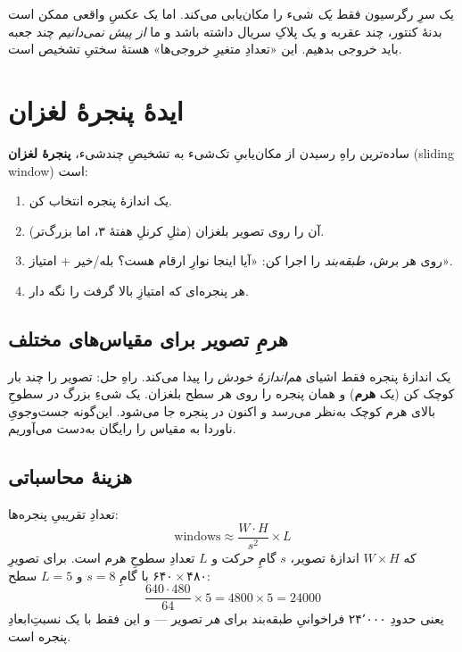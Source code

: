 \documentclass[12pt,a4paper]{article}
\begin{document}
\begin{hoshdar}
یک سرِ رگرسیون فقط \emph{یک} شیء را مکان‌یابی می‌کند. اما یک عکسِ واقعی ممکن است بدنهٔ کنتور، چند عقربه و یک پلاکِ سریال داشته باشد و ما \emph{از پیش نمی‌دانیم} چند جعبه باید خروجی بدهیم. این «تعدادِ متغیرِ خروجی‌ها» هستهٔ سختیِ تشخیص است.
\end{hoshdar}

\section{ایدهٔ پنجرهٔ لغزان}

ساده‌ترین راهِ رسیدن از مکان‌یابیِ تک‌شیء به تشخیصِ چندشیء، \textbf{پنجرهٔ لغزان} (sliding window) است:

\begin{enumerate}
  \item یک اندازهٔ پنجره انتخاب کن.
  \item آن را روی تصویر بلغزان (مثلِ کرنلِ هفتهٔ ۳، اما بزرگ‌تر).
  \item روی هر برش، \emph{طبقه‌بند} را اجرا کن: «آیا اینجا نوارِ ارقام هست؟ بله/خیر + امتیاز».
  \item هر پنجره‌ای که امتیازِ بالا گرفت را نگه دار.
\end{enumerate}

\subsection{هرمِ تصویر برای مقیاس‌های مختلف}

یک اندازهٔ پنجره فقط اشیای \emph{هم‌اندازهٔ خودش} را پیدا می‌کند. راهِ حل: تصویر را چند بار کوچک کن (یک \textbf{هرم}) و همان پنجره را روی هر سطح بلغزان. یک شیءِ بزرگ در سطوحِ بالای هرم کوچک به‌نظر می‌رسد و اکنون در پنجره جا می‌شود. این‌گونه جست‌وجویِ ناوردا به مقیاس را رایگان به‌دست می‌آوریم.

\subsection{هزینهٔ محاسباتی}

\begin{riyazi}
تعدادِ تقریبیِ پنجره‌ها:
\[
\text{windows}\approx \frac{W\cdot H}{s^2}\times L
\]
که $W\times H$ اندازهٔ تصویر، $s$ گامِ حرکت و $L$ تعدادِ سطوحِ هرم است. برای تصویرِ $۶۴۰\times۴۸۰$ با گامِ $s=8$ و $L=5$ سطح:
\[
\frac{640\cdot480}{64}\times5 = 4800\times5 = 24000
\]
یعنی حدودِ ۲۴٬۰۰۰ فراخوانیِ طبقه‌بند برای \emph{هر} تصویر — و این فقط با یک نسبتِ‌ابعادِ پنجره است.
\end{riyazi}
\end{document}
